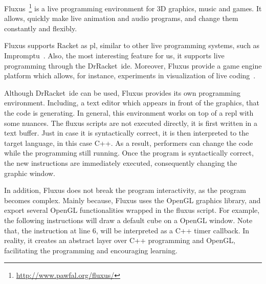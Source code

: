 Fluxus~\footnote{\url{http://www.pawfal.org/fluxus/}} is a live programming environment for 3D graphics, music and games. It  allows, quickly make live animation and audio programs, and change them constantly and flexibly. 

Fluxus supports Racket as \ac{pl}, similar to other live programming systems, such as Impromptu~\cite{sorensen2005impromptu}. Also, the most  interesting feature for us, it supports live programming through the DrRacket~\ac{ide}. Moreover, Fluxus provide a game engine platform which allows, for instance, experiments in visualization of live coding~\cite{mclean2010visualisation}.

%

Although DrRacket~\ac{ide} can be used, Fluxus provides its own programming environment. Including, a text editor which appears in front of the graphics, that the code is generating. In general, this environment works on top of a \ac{repl} with some nuances. The fluxus scripts are not executed directly, it is first written in a text buffer. Just in case it is syntactically correct, it is then interpreted to the target language, in this case {\small C++}. As a result, performers can change the code while the programming still running. Once the program is syntactically correct, the new instructions are immediately executed, consequently changing the graphic window.

In addition, Fluxus does not break the program interactivity, as the program becomes complex. Mainly because, Fluxus uses the OpenGL graphics library, and export several OpenGL functionalities wrapped in the fluxus script. For example, the following instructions will draw a default cube on a OpenGL window. Note that, the instruction at line 6, will be interpreted as a {\small C++} timer callback. In reality, it creates an abstract layer over {\small C++} programming and OpenGL, facilitating the programming and encouraging learning. 


